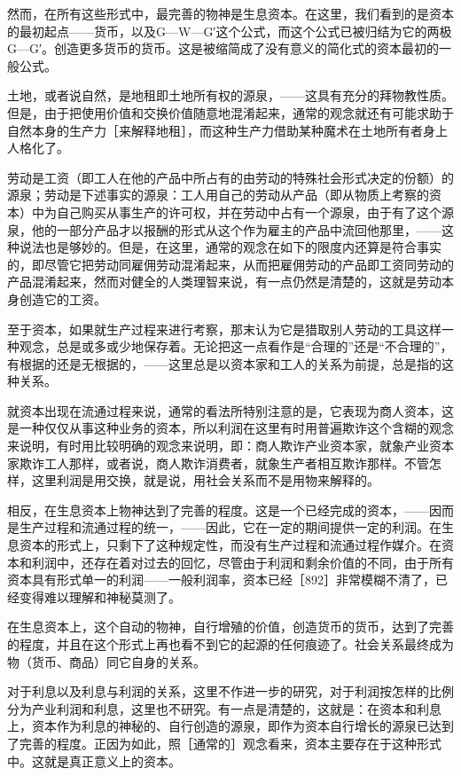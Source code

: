然而，在所有这些形式中，最完善的物神是生息资本。在这里，我们看到的是资本的最初起点——货币，以及G—W—G′这个公式，而这个公式已被归结为它的两极G—G′。创造更多货币的货币。这是被缩简成了没有意义的简化式的资本最初的一般公式。

土地，或者说自然，是地租即土地所有权的源泉，——这具有充分的拜物教性质。但是，由于把使用价值和交换价值随意地混淆起来，通常的观念就还有可能求助于自然本身的生产力［来解释地租］，而这种生产力借助某种魔术在土地所有者身上人格化了。

劳动是工资（即工人在他的产品中所占有的由劳动的特殊社会形式决定的份额）的源泉；劳动是下述事实的源泉：工人用自己的劳动从产品（即从物质上考察的资本）中为自己购买从事生产的许可权，并在劳动中占有一个源泉，由于有了这个源泉，他的一部分产品才以报酬的形式从这个作为雇主的产品中流回他那里，——这种说法也是够妙的。但是，在这里，通常的观念在如下的限度内还算是符合事实的，即尽管它把劳动同雇佣劳动混淆起来，从而把雇佣劳动的产品即工资同劳动的产品混淆起来，然而对健全的人类理智来说，有一点仍然是清楚的，这就是劳动本身创造它的工资。

至于资本，如果就生产过程来进行考察，那末认为它是猎取别人劳动的工具这样一种观念，总是或多或少地保存着。无论把这一点看作是“合理的”还是“不合理的”，有根据的还是无根据的，——这里总是以资本家和工人的关系为前提，总是指的这种关系。

就资本出现在流通过程来说，通常的看法所特别注意的是，它表现为商人资本，这是一种仅仅从事这种业务的资本，所以利润在这里有时用普遍欺诈这个含糊的观念来说明，有时用比较明确的观念来说明，即：商人欺诈产业资本家，就象产业资本家欺诈工人那样，或者说，商人欺诈消费者，就象生产者相互欺诈那样。不管怎样，这里利润是用交换，就是说，用社会关系而不是用物来解释的。

相反，在生息资本上物神达到了完善的程度。这是一个已经完成的资本，——因而是生产过程和流通过程的统一，——因此，它在一定的期间提供一定的利润。在生息资本的形式上，只剩下了这种规定性，而没有生产过程和流通过程作媒介。在资本和利润中，还存在着对过去的回忆，尽管由于利润和剩余价值的不同，由于所有资本具有形式单一的利润——一般利润率，资本已经［892］非常模糊不清了，已经变得难以理解和神秘莫测了。

在生息资本上，这个自动的物神，自行增殖的价值，创造货币的货币，达到了完善的程度，并且在这个形式上再也看不到它的起源的任何痕迹了。社会关系最终成为物（货币、商品）同它自身的关系。

对于利息以及利息与利润的关系，这里不作进一步的研究，对于利润按怎样的比例分为产业利润和利息，这里也不研究。有一点是清楚的，这就是：在资本和利息上，资本作为利息的神秘的、自行创造的源泉，即作为资本自行增长的源泉已达到了完善的程度。正因为如此，照［通常的］观念看来，资本主要存在于这种形式中。这就是真正意义上的资本。

